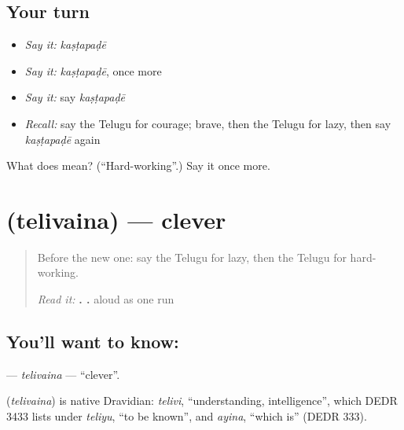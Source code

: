 \subsection*{Your turn}
\begin{itemize}
\raggedright
  \item \emph{Say it:} \emph{kaṣṭapaḍē}
  \item \emph{Say it:} \emph{kaṣṭapaḍē}, once more
  \item \emph{Say it:} say \emph{kaṣṭapaḍē}
  \item \emph{Recall:} say the Telugu for courage; brave, then the Telugu for lazy, then say \emph{kaṣṭapaḍē} again
\end{itemize}

\begin{tcolorbox}[breakable,colback=teal!4,colframe=teal!35!black,title={Before you move on}]
What does  mean? (\textquotedblleft{}Hard-working\textquotedblright{}.) Say it once more.
\end{tcolorbox}
\section[\texorpdfstring{\te{తెలివైన} (telivaina)}{తెలివైన (telivaina)}]{ (telivaina) — clever}

\label{lesson:TE-C142-telivaina}



\begin{quote}
Before the new one: say the Telugu for lazy, then the Telugu for hard-working.

\emph{Read it:} \textbf{ .   .} aloud as one run
\end{quote}

\subsection*{You'll want to know: }
\textbf{} — \emph{telivaina} — \textquotedblleft{}clever\textquotedblright{}.

\begin{cousinweb}
\textbf{} (\emph{telivaina}) is native Dravidian: \emph{telivi}, \textquotedblleft{}understanding, intelligence\textquotedblright{}, which DEDR 3433 lists under \emph{teliyu}, \textquotedblleft{}to be known\textquotedblright{}, and \emph{ayina}, \textquotedblleft{}which is\textquotedblright{} (DEDR 333).
\end{cousinweb}

